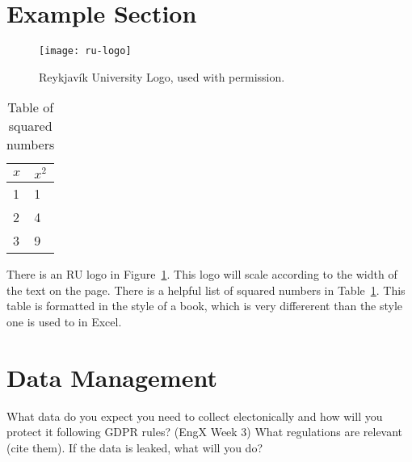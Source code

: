 \section{Example Section}
\begin{figure}
  \centering
  \texttt{[image: ru-logo]}
  \caption[RU Logo]{Reykjavík University Logo, used with permission.}\label{fig:ru-logo}
\end{figure}
\begin{table}
  \centering
  \begin{tabular}{ll}\toprule
    $x$& $x^{2}$\\\midrule
    1 &1\\
    2 &4\\
    3 &9\\\bottomrule
  \end{tabular}
  \caption{Table of squared numbers}\label{tab:numbers}
\end{table}
There is an RU logo in Figure~\ref{fig:ru-logo}.
This logo will scale according to the width of the text on the page.
There is a helpful list of squared numbers in Table~\ref{tab:numbers}.
This table is formatted in the style of a book, which is very differerent than the style one is used to in Excel.

\section{Data Management}
What data do you expect you need to collect electonically and how will you protect it following GDPR rules?  (EngX Week 3)
What regulations are relevant (cite them).
If the data is leaked, what will you do?


